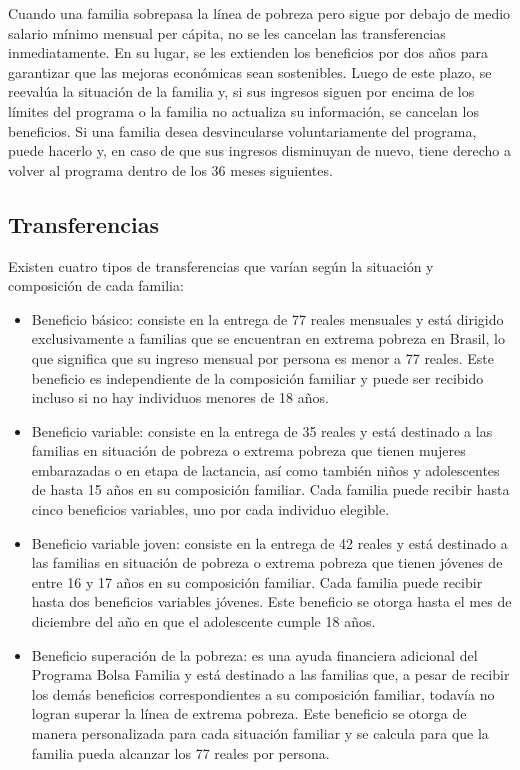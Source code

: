 \documentclass[
]{article}
\begin{document}
Cuando una familia sobrepasa la línea de pobreza pero sigue por debajo
de medio salario mínimo mensual per cápita, no se les cancelan las
transferencias inmediatamente. En su lugar, se les extienden los
beneficios por dos años para garantizar que las mejoras económicas sean
sostenibles. Luego de este plazo, se reevalúa la situación de la familia
y, si sus ingresos siguen por encima de los límites del programa o la
familia no actualiza su información, se cancelan los beneficios. Si una
familia desea desvincularse voluntariamente del programa, puede hacerlo
y, en caso de que sus ingresos disminuyan de nuevo, tiene derecho a
volver al programa dentro de los 36 meses siguientes.

\hypertarget{transferencias}{%
\subsection{Transferencias}\label{transferencias}}

Existen cuatro tipos de transferencias que varían según la situación y
composición de cada familia:

\begin{itemize}
\item
  Beneficio básico: consiste en la entrega de 77 reales mensuales y está
  dirigido exclusivamente a familias que se encuentran en extrema
  pobreza en Brasil, lo que significa que su ingreso mensual por persona
  es menor a 77 reales. Este beneficio es independiente de la
  composición familiar y puede ser recibido incluso si no hay individuos
  menores de 18 años.
\item
  Beneficio variable: consiste en la entrega de 35 reales y está
  destinado a las familias en situación de pobreza o extrema pobreza que
  tienen mujeres embarazadas o en etapa de lactancia, así como también
  niños y adolescentes de hasta 15 años en su composición familiar. Cada
  familia puede recibir hasta cinco beneficios variables, uno por cada
  individuo elegible.
\item
  Beneficio variable joven: consiste en la entrega de 42 reales y está
  destinado a las familias en situación de pobreza o extrema pobreza que
  tienen jóvenes de entre 16 y 17 años en su composición familiar. Cada
  familia puede recibir hasta dos beneficios variables jóvenes. Este
  beneficio se otorga hasta el mes de diciembre del año en que el
  adolescente cumple 18 años.
\item
  Beneficio superación de la pobreza: es una ayuda financiera adicional
  del Programa Bolsa Familia y está destinado a las familias que, a
  pesar de recibir los demás beneficios correspondientes a su
  composición familiar, todavía no logran superar la línea de extrema
  pobreza. Este beneficio se otorga de manera personalizada para cada
  situación familiar y se calcula para que la familia pueda alcanzar los
  77 reales por persona.
\end{itemize}
\end{document}

